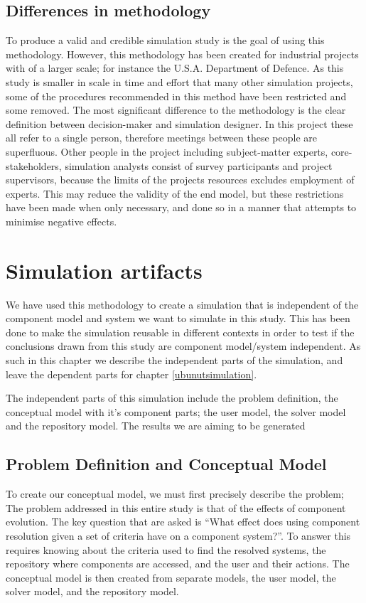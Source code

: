 \subsection{Differences in methodology}
To produce a valid and credible simulation study is the goal of using this methodology.
However, this methodology has been created for industrial projects with of a larger scale; for instance the U.S.A. Department of Defence.
As this study is smaller in scale in time and effort that many other simulation projects, some of the procedures recommended in this method have been restricted and some removed.
The most significant difference to the methodology is the clear definition between decision-maker and simulation designer.
In this project these all refer to a single person, therefore meetings between these people are superfluous.
Other people in the project including subject-matter experts, core-stakeholders, simulation analysts consist of survey participants and
project supervisors, because the limits of the projects resources excludes employment of experts.
This may reduce the validity of the end model, but these restrictions have been made when only necessary,
and done so in a manner that attempts to minimise negative effects.


\section{Simulation artifacts}
We have used this methodology to create a simulation that is independent of the component model and system we want to simulate in this study.
This has been done to make the simulation reusable in different contexts in order to test if the conclusions drawn from this study are component model/system independent.
As such in this chapter we describe the independent parts of the simulation, and leave the dependent parts for chapter \ref{ubunutsimulation}.

The independent parts of this simulation include the problem definition, the conceptual model with it's component parts;
the user model, the solver model and the repository model.
The results we are aiming to be generated

\subsection{Problem Definition and Conceptual Model}
To create our conceptual model, we must first precisely describe the problem;
The problem addressed in this entire study is that of the effects of component evolution.
The key question that are asked is
``What effect does using component resolution given a set of criteria have on a component system?''.
To answer this requires knowing about the criteria used to find the resolved systems, the repository where components are accessed,
and the user and their actions.
The conceptual model is then created from separate models, the user model, the solver model, and the repository model.

